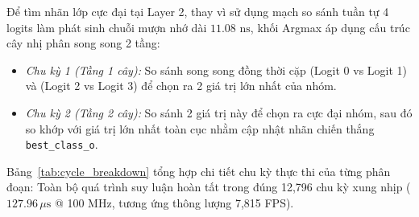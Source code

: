 \documentclass[conference]{IEEEtran}
\begin{document}
Để tìm nhãn lớp cực đại tại Layer 2, thay vì sử dụng mạch so sánh tuần tự 4 logits làm phát sinh chuỗi mượn nhớ dài $11.08\text{ ns}$, khối Argmax áp dụng cấu trúc cây nhị phân song song 2 tầng:
\begin{itemize}
    \item \textit{Chu kỳ 1 (Tầng 1 cây):} So sánh song song đồng thời cặp (Logit 0 vs Logit 1) và (Logit 2 vs Logit 3) để chọn ra 2 giá trị lớn nhất của nhóm.
    \item \textit{Chu kỳ 2 (Tầng 2 cây):} So sánh 2 giá trị này để chọn ra cực đại nhóm, sau đó so khớp với giá trị lớn nhất toàn cục nhằm cập nhật nhãn chiến thắng \texttt{best\_class\_o}.
\end{itemize}

Bảng~\ref{tab:cycle_breakdown} tổng hợp chi tiết chu kỳ thực thi của từng phân đoạn: Toàn bộ quá trình suy luận hoàn tất trong đúng 12,796 chu kỳ xung nhịp ($127.96\,\mu\text{s}$ @ 100 MHz, tương ứng thông lượng 7,815 FPS).

\begin{table}[tbp]
\centering
\caption{Bảng Chu Kỳ Thực Thi và Phân Bổ Độ Trễ Chi Tiết Qua Từng Tầng Mạng Nơ-ron}
\label{tab:cycle_breakdown}
\setlength{\tabcolsep}{3.5pt}
\renewcommand{\arraystretch}{1.1}
\end{table}
\end{document}

